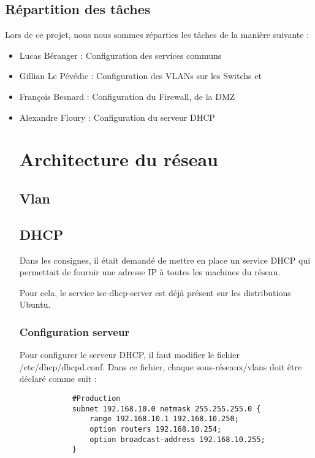 \documentclass[a4paper,12pt]{report}
\begin{document}
        \section{Répartition des tâches}
            Lors de ce projet, nous nous sommes réparties les tâches de la manière suivante :
            \begin{itemize}
                \item Lucas Béranger : Configuration des services communs
                \item Gillian Le Pévédic : Configuration des VLANs sur les Switchs et 
                \item François Besnard :  Configuration du Firewall, de la DMZ
                \item Alexandre Floury : Configuration du serveur DHCP


    \chapter{Architecture du réseau}
        \section{Vlan}
        \section{DHCP}
            Dans les consignes, il était demandé de mettre en place un service DHCP qui permettait de fournir une adresse IP à toutes les machines du réseau. 
            
            Pour cela, le service isc-dhcp-server est déjà présent sur les distributions Ubuntu.
            \subsection{Configuration serveur}
            Pour configurer le serveur DHCP, il faut modifier le fichier /etc/dhcp/dhcpd.conf. 
            Dans ce fichier, chaque sous-réseaux/vlans doit être déclaré comme suit :
                

            \begin{verbatim}
            #Production
            subnet 192.168.10.0 netmask 255.255.255.0 {
                range 192.168.10.1 192.168.10.250;
                option routers 192.168.10.254;
                option broadcast-address 192.168.10.255;
            }
            \end{verbatim}


\end{itemize}
\end{document}
